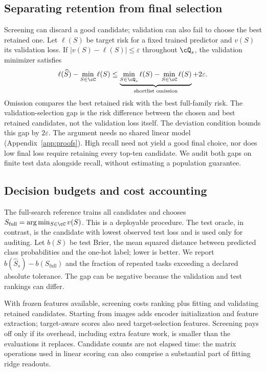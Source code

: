 \subsection{Separating retention from final selection}
Screening can discard a good candidate; validation can also fail to choose the best retained one. Let $\ell(S)$ be target risk for a fixed trained predictor and $v(S)$ its validation loss. If $|v(S)-\ell(S)|\leq\varepsilon$ throughout $\cQ_s$, the validation minimizer satisfies
\begin{equation}
 \ell(\widehat S)-\min_{S\in\cC}\ell(S)
 \leq
 \underbrace{\min_{S\in\cQ_s}\ell(S)-\min_{S\in\cC}\ell(S)}_{\text{shortlist omission}}
 +2\varepsilon.
 \label{eq:decomposition}
\end{equation}
Omission compares the best retained risk with the best full-family risk. The validation-selection gap is the risk difference between the chosen and best retained candidates, not the validation loss itself. The deviation condition bounds this gap by $2\varepsilon$. The argument needs no shared linear model (Appendix~\ref{app:proofs}). High recall need not yield a good final choice, nor does low final loss require retaining every top-ten candidate. We audit both gaps on finite test data alongside recall, without estimating a population guarantee.

\subsection{Decision budgets and cost accounting}
The full-search reference trains all candidates and chooses $S_{\mathrm{full}}=\arg\min_{S\in\cC}v(S)$. This is a deployable procedure. The test oracle, in contrast, is the candidate with lowest observed test loss and is used only for auditing. Let $b(S)$ be test Brier, the mean squared distance between predicted class probabilities and the one-hot label; lower is better. We report $b(\widehat S_s)-b(S_{\mathrm{full}})$ and the fraction of repeated tasks exceeding a declared absolute tolerance. The gap can be negative because the validation and test rankings can differ.

With frozen features available, screening costs ranking plus fitting and validating retained candidates. Starting from images adds encoder initialization and feature extraction; target-aware scores also need target-selection features. Screening pays off only if its overhead, including extra feature work, is smaller than the evaluations it replaces. Candidate counts are not elapsed time: the matrix operations used in linear scoring can also comprise a substantial part of fitting ridge readouts.

